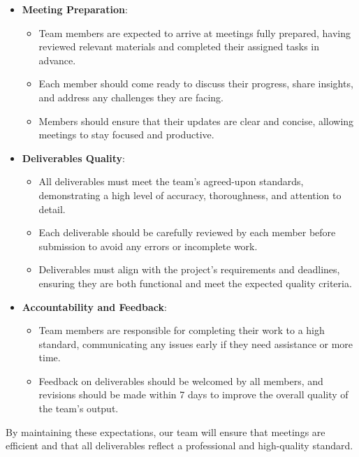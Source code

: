 \documentclass{article}
\begin{document}
\begin{itemize}
  \item \textbf{Meeting Preparation}:
    \begin{itemize}
      \item Team members are expected to arrive at meetings fully
        prepared, having reviewed relevant materials and completed
        their assigned tasks in advance.
      \item Each member should come ready to discuss their progress,
        share insights, and address any challenges they are facing.
      \item Members should ensure that their updates are clear and
        concise, allowing meetings to stay focused and productive.
    \end{itemize}

  \item \textbf{Deliverables Quality}:
    \begin{itemize}
      \item All deliverables must meet the team’s agreed-upon
        standards, demonstrating a high level of accuracy,
        thoroughness, and attention to detail.
      \item Each deliverable should be carefully reviewed by each
        member before submission to avoid any errors or incomplete work.
      \item Deliverables must align with the project's requirements
        and deadlines, ensuring they are both functional and meet the
        expected quality criteria.
    \end{itemize}

  \item \textbf{Accountability and Feedback}:
    \begin{itemize}
        \item Team members are responsible for completing their work to a high standard, communicating any issues early if they need assistance or more time.
        \item Feedback on deliverables should be welcomed by all members, and revisions should be made within 7 days to improve the overall quality of the team’s output.
    \end{itemize}

\end{itemize}

\noindent
By maintaining these expectations, our team will ensure that meetings
are efficient and that all deliverables reflect a professional and
high-quality standard.
\end{document}
